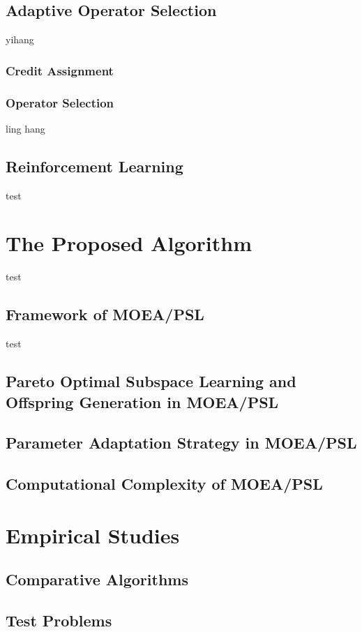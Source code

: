 \documentclass[journal]{IEEEtran}
\begin{document}
\subsection{Adaptive Operator Selection}
yihang
\subsubsection{Credit Assignment}

\subsubsection{Operator Selection}

ling hang

\subsection{Reinforcement Learning}
test
\section{The Proposed Algorithm}
test
\subsection{Framework of MOEA/PSL}
test
\subsection{Pareto Optimal Subspace Learning and Offspring Generation in MOEA/PSL}

\subsection{Parameter Adaptation Strategy in MOEA/PSL}

\subsection{Computational Complexity of MOEA/PSL}


\section{Empirical Studies}


\subsection{Comparative Algorithms}

\subsection{Test Problems}
\end{document}
